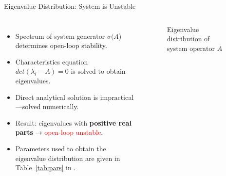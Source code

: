 \documentclass[8pt]{beamer}
\begin{document}
\begin{frame}{Eigenvalue Distribution: System is Unstable}

\begin{columns}[c]

\begin{itemize}
    \item Spectrum of system generator $\sigma(A$) determines open-loop stability.
    \item Characteristics equation $det(\lambda_i-A) = 0$ is solved to obtain eigenvalues.
    \item Direct analytical solution is impractical—solved numerically.
    \item Result: eigenvalues with \textbf{positive real parts} → \textcolor{red}{open-loop unstable}.
    \item Parameters used to obtain the eigenvalue distribution are given in Table~\ref{tab:pars} in .
\end{itemize}

\begin{figure}
    \centering
    
    \caption{Eigenvalue distribution of system operator \( A \)}
\end{figure}
\end{columns}
\end{frame}
\end{document}
